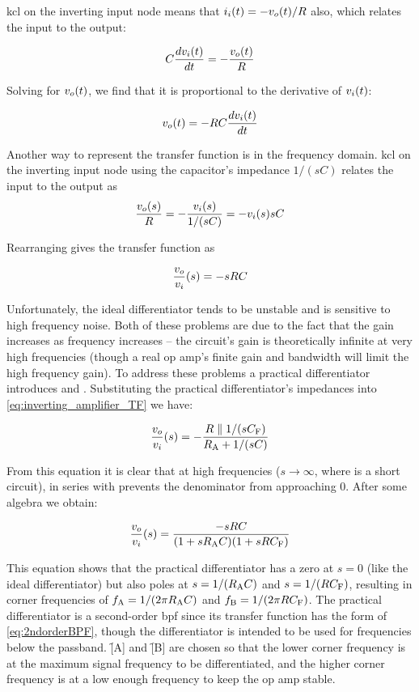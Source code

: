 \ac{kcl} on the inverting input node means that \(\iin(t) = -\vout(t)/R\) also, which relates the input to the output:

\[C\frac{d\vin(t)}{dt} = -\frac{\vout(t)}{R}\]

Solving for \(\vout(t)\), we find that it is proportional to the derivative of \(\vin(t)\):

\begin{equation}
	\vout(t) = -RC\frac{d\vin(t)}{dt}
	\label{eq:ideal_differentiator_time}
\end{equation}

Another way to represent the transfer function is in the frequency domain.
\ac{kcl} on the inverting input node using the capacitor's impedance \(1/(sC)\) relates the input to the output as \[\frac{\vout(s)}{R} = -\frac{\vin(s)}{1/(sC)}= -\vin(s)sC\]

Rearranging gives the transfer function as

\begin{equation}
	\frac{\vout}{\vin}(s) = -sRC
	\label{eq:ideal_differentiator_TF}
\end{equation}

Unfortunately, the ideal differentiator tends to be unstable and is sensitive to high frequency noise.
Both of these problems are due to the fact that the gain increases as frequency increases -- the circuit's gain is theoretically infinite at very high frequencies (though a real op amp's finite gain and bandwidth will limit the high frequency gain).
To address these problems a practical differentiator introduces \R[A] and \C[F].
Substituting the practical differentiator's impedances into \eqref{eq:inverting_amplifier_TF} we have:

\[\frac{\vout}{\vin}(s) = -\frac{R \parallel 1/(s\C[F])}{\R[A] + 1/(s\C)}\]

From this equation it is clear that at high frequencies (\(s \to \infty\), where \C is a short circuit), \R[A] in series with \C prevents the denominator from approaching 0.
After some algebra we obtain:

\begin{equation}
	\frac{\vout}{\vin}(s) = \frac{-sRC}{(1 + s\R[A] C)(1 + s R \C[F])}
	\label{eq:practical_differentiator_TF}
\end{equation}

This equation shows that the practical differentiator has a zero at \(s = 0\) (like the ideal differentiator) but also poles at \(s = 1/(\R[A] C)\) and \(s = 1/(R \C[F])\), resulting in corner frequencies of \(\f[A] = 1/(2\pi\R[A] C)\) and \(\f[B] = 1/(2\pi R \C[F])\).
The practical differentiator is a second-order \ac{bpf} since its transfer function has the form of \eqref{eq:2ndorderBPF}, though the differentiator is intended to be used for frequencies below the passband.
\f[A] and \f[B] are chosen so that the lower corner frequency is at the maximum signal frequency to be differentiated, and the higher corner frequency is at a low enough frequency to keep the op amp stable.


